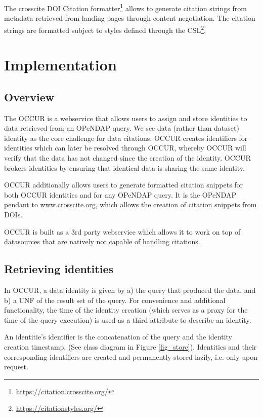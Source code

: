 \documentclass[letterpaper, twocolumn, parskip=half, fontsize=8pt, DIV=calc]{scrartcl}
\begin{document}
The crosscite DOI Citation formatter\footnote{\url{https://citation.crosscite.org/}} allows to generate citation strings from metadata retrieved from landing pages through content negotiation.
The citation strings are formatted subject to styles defined through the \gls{CSL}\footnote{\url{https://citationstyles.org/}}.

\section{Implementation}

\subsection{Overview}
The \Gls{OCCUR} is a webservice that allows users to assign and store identities to data retrieved from an \gls{OPeNDAP} query. We see data (rather than dataset) identity as the core challenge for data citations.
OCCUR creates identifiers for identities which can later be resolved through \gls{OCCUR}, whereby \gls{OCCUR} will verify that the data has not changed since the creation of the identity. OCCUR brokers identities by ensuring that identical data is sharing the same identity.

OCCUR additionally allows users to generate formatted citation snippets for both OCCUR identities and for any \gls{OPeNDAP} query. It is the OPeNDAP pendant to \url{www.crosscite.org}, which allows the creation of citation snippets from \glspl{DOI}. 

\gls{OCCUR} is built as a 3rd party webservice which allows it to work on top of datasources that are natively not capable of handling citations.


\subsection{Retrieving identities}
In OCCUR, a data identity is given by a) the query that produced the data, and b) a UNF of the result set of the query. For convenience and additional functionality, the time of the identity creation (which serves as a proxy for the time of the query execution) is used as a third attribute to describe an identity.

An identitie's identifier is the concatenation of the query and the identity creation timestamp. (See class diagram in Figure \ref{fig_store}). Identities and their corresponding identifiers are created and permanently stored lazily, i.e. only upon request.
\end{document}
